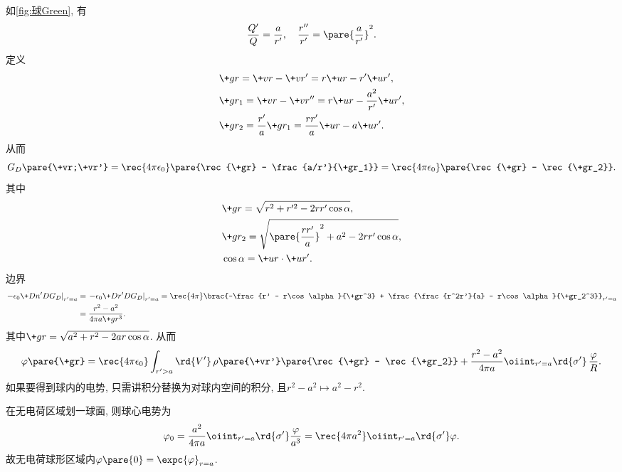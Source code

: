 \documentclass[hidelinks]{ctexart}
\begin{document}
\begin{sample}
    \begin{ex}
        如\cref{fig:球Green}, 有
        \[ \frac{Q'}{Q} = \frac{a}{r'},\quad \frac{r''}{r'} = \pare{\frac{a}{r'}}^2. \]
        定义
        \begin{align*}
            & \+gr = \+vr - \+vr' = r\+ur - r'\+ur',\\
            & \+gr_1 = \+vr - \+vr'' = r\+ur - \frac{a^2}{r'}\+ur',\\
            & \+gr_2 = \frac{r'}{a}\+gr_1 = \frac{rr'}{a}\+ur - a\+ur'.
        \end{align*}
        从而
        \[ G_D\pare{\+vr;\+vr'} = \rec{4\pi\epsilon_0}\pare{\rec{\+gr} - \frac{a/r'}{\+gr_1}} = \rec{4\pi\epsilon_0}\pare{\rec{\+gr} - \rec{\+gr_2}}. \]
        其中
        \begin{align*}
            &\+gr = \sqrt{r^2 + r'^2 - 2rr'\cos \alpha},\\
            &\+gr_2 = \sqrt{\pare{\frac{rr'}{a}}^2 + a^2 - 2rr'\cos\alpha},\\
            &\cos\alpha = \+ur\cdot \+ur'.
        \end{align*}
        边界
        \begin{align*}
            \left.-\epsilon_0 \+D{n'}D{G_D}\right\vert_{r'=a} &= \left.-\epsilon_0 \+D{r'}D{G_D}\right\vert_{r'=a} = \rec{4\pi}\brac{-\frac{r' - r\cos\alpha}{\+gr^3} + \frac{\frac{r^2r'}{a} - r\cos\alpha}{\+gr_2^3}}_{r' = a}\\
            &= \frac{r^2 - a^2}{4\pi a\+gr^3}.
        \end{align*}
        其中$\+gr = \sqrt{a^2 + r^2 - 2ar\cos\alpha}$. 从而
        \[ \varphi\pare{\+gr} = \rec{4\pi\epsilon_0}\int_{r'>a}\rd{V'}\,\rho\pare{\+vr'}\pare{\rec{\+gr} - \rec{\+gr_2}} + \frac{r^2-a^2}{4\pi a}\oiint_{r'=a}\rd{\sigma'}\,\frac{\varphi}{R}. \]
        如果要得到球内的电势, 只需讲积分替换为对球内空间的积分, 且$r^2 - a^2\mapsto a^2 - r^2$.
    \end{ex}
\end{sample}
\begin{sample}
    \begin{ex}
        在无电荷区域划一球面, 则球心电势为
        \[ \varphi_0 = \frac{a^2}{4\pi a}\oiint_{r'=a}\rd{\sigma'}\frac{\varphi}{a^3} = \rec{4\pi a^2}\oiint_{r'=a}\rd{\sigma'}\varphi. \]
        故无电荷球形区域内$\varphi\pare{0} = \expc{\varphi}_{r=a}$.
    \end{ex}
\end{sample}
\end{document}
